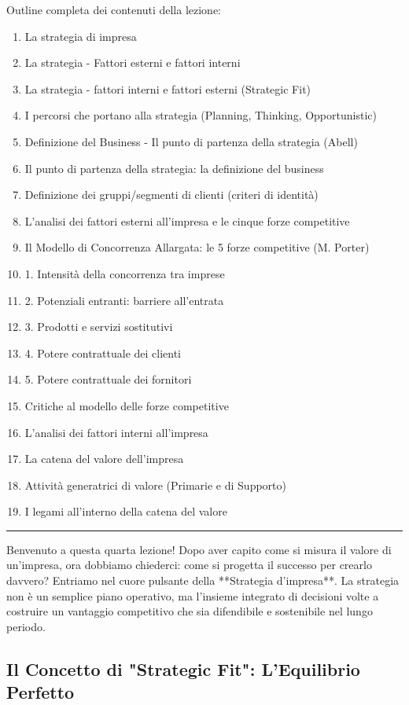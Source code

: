 \documentclass[a4paper,10pt]{article}
\begin{document}
Outline completa dei contenuti della lezione:
{\small
\begin{enumerate}
\item La strategia di impresa
\item La strategia - Fattori esterni e fattori interni
\item La strategia - fattori interni e fattori esterni (Strategic Fit)
\item I percorsi che portano alla strategia (Planning, Thinking, Opportunistic)
\item Definizione del Business - Il punto di partenza della strategia (Abell)
\item Il punto di partenza della strategia: la definizione del business
\item Definizione dei gruppi/segmenti di clienti (criteri di identità)
\item L’analisi dei fattori esterni all’impresa e le cinque forze competitive
\item Il Modello di Concorrenza Allargata: le 5 forze competitive (M. Porter)
\item 1. Intensità della concorrenza tra imprese
\item 2. Potenziali entranti: barriere all’entrata
\item 3. Prodotti e servizi sostitutivi
\item 4. Potere contrattuale dei clienti
\item 5. Potere contrattuale dei fornitori
\item Critiche al modello delle forze competitive
\item L’analisi dei fattori interni all’impresa
\item La catena del valore dell’impresa
\item Attività generatrici di valore (Primarie e di Supporto)
\item I legami all’interno della catena del valore
\end{enumerate}
}
\hrule
\vspace{0.5cm}

Benvenuto a questa quarta lezione! Dopo aver capito come si misura il valore di un'impresa, ora dobbiamo chiederci: come si progetta il successo per crearlo davvero? Entriamo nel cuore pulsante della **Strategia d'impresa**. La strategia non è un semplice piano operativo, ma l'insieme integrato di decisioni volte a costruire un vantaggio competitivo che sia difendibile e sostenibile nel lungo periodo.

\subsection*{Il Concetto di "Strategic Fit": L'Equilibrio Perfetto}
\end{document}
